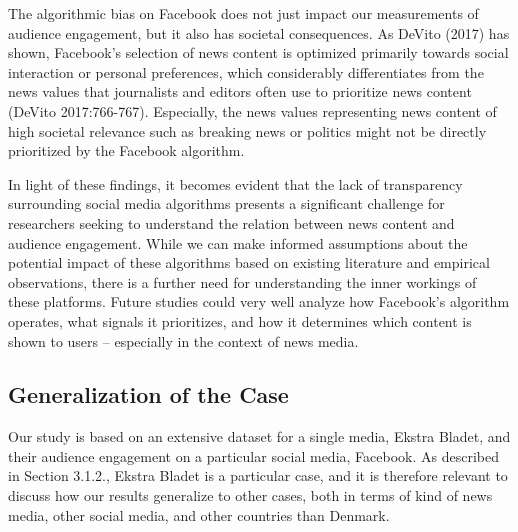 \documentclass[
]{article}
\begin{document}
The algorithmic bias on Facebook does not just impact our measurements
of audience engagement, but it also has societal consequences. As DeVito
(2017) has shown, Facebook's selection of news content is optimized
primarily towards social interaction or personal preferences, which
considerably differentiates from the news values that journalists and
editors often use to prioritize news content (DeVito 2017:766-767).
Especially, the news values representing news content of high societal
relevance such as breaking news or politics might not be directly
prioritized by the Facebook algorithm.

In light of these findings, it becomes evident that the lack of
transparency surrounding social media algorithms presents a significant
challenge for researchers seeking to understand the relation between
news content and audience engagement. While we can make informed
assumptions about the potential impact of these algorithms based on
existing literature and empirical observations, there is a further need
for understanding the inner workings of these platforms. Future studies
could very well analyze how Facebook's algorithm operates, what signals
it prioritizes, and how it determines which content is shown to users --
especially in the context of news media.

\hypertarget{generalization-of-the-case}{%
\subsection{Generalization of the
Case}\label{generalization-of-the-case}}

Our study is based on an extensive dataset for a single media, Ekstra
Bladet, and their audience engagement on a particular social media,
Facebook. As described in Section 3.1.2., Ekstra Bladet is a particular
case, and it is therefore relevant to discuss how our results generalize
to other cases, both in terms of kind of news media, other social media,
and other countries than Denmark.
\end{document}
